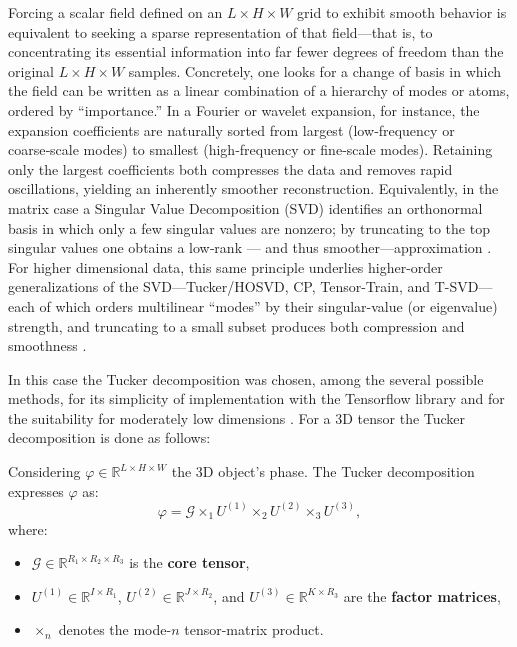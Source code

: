 Forcing a scalar field defined on an  $L\times H\times W$ grid to exhibit smooth behavior is equivalent to seeking a 
sparse representation of that field—that is, to concentrating its essential information into far fewer degrees of freedom 
than the original $L\times H\times W$ samples. 
Concretely, one looks for a change of basis in which the field can be written as a linear combination of a hierarchy 
of modes or atoms, ordered by “importance.” In a Fourier or wavelet expansion, for instance, the expansion coefficients 
are naturally sorted from largest (low‑frequency or coarse‑scale modes) to smallest (high‑frequency or fine‑scale modes). 
Retaining only the largest coefficients both compresses the data and removes rapid oscillations, yielding an inherently 
smoother reconstruction. Equivalently, in the matrix case a Singular Value Decomposition (SVD) identifies an orthonormal 
basis in which only a few singular values are nonzero; by truncating to the top singular values one obtains a low‑rank 
— and thus smoother—approximation \cite{golub1996matrix}. For higher dimensional data, this same principle underlies 
higher-order generalizations of the SVD—Tucker/HOSVD, CP, Tensor-Train, and T-SVD—each of which orders multilinear 
“modes” by their singular-value (or eigenvalue) strength, and truncating to a small subset produces both compression 
and smoothness \cite{Kolda_TT}. 

In this case the Tucker decomposition was chosen, among the several possible methods, for its simplicity of implementation 
with the Tensorflow library and for the suitability for moderately low dimensions \cite{Oseledets_TT}. 
For a 3D tensor the Tucker decomposition is done as follows: 

Considering \(\mathcal{\varphi} \in \mathbb{R}^{L \times H \times W}\) the 3D object's phase. The Tucker decomposition expresses \(\mathcal{\varphi}\) as:
\[
\mathcal{\varphi} = \mathcal{G} \times_1 U^{(1)} \times_2 U^{(2)} \times_3 U^{(3)},
\]
where:
\begin{itemize}
  \item \(\mathcal{G} \in \mathbb{R}^{R_1 \times R_2 \times R_3}\) is the \textbf{core tensor},
  \item \(U^{(1)} \in \mathbb{R}^{I \times R_1}\), \(U^{(2)} \in \mathbb{R}^{J \times R_2}\), and \(U^{(3)} \in \mathbb{R}^{K \times R_3}\) are the \textbf{factor matrices},
  \item \(\times_n\) denotes the mode-\(n\) tensor-matrix product.
\end{itemize}

